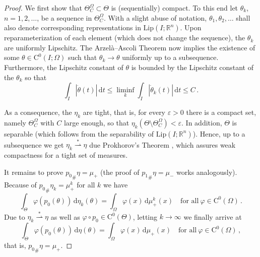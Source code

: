 \documentclass[10pt,a4paper,oneside,final]{article}
\newcommand{\R}{{\mathbb{R}}}
\newcommand{\de}{{\mathrm{d}}}
\newcommand{\pushforward}[2]{{{#1}_{\#}#2}}
\newcommand{\weakstarto}{\stackrel{*}{\rightharpoonup}}
\newcommand{\Lip}{\mathrm{Lip}}
\newcommand{\cont}{{\mathrm{C}}}
\newcommand{\contbdd}{\cont^0}
\numberwithin{equation}{section}
\theoremstyle{plain}
\theoremstyle{definition}
\theoremstyle{remark}
\begin{document}
\begin{proof}
We first show that $\Theta_C^\Omega\subset\Theta$ is (sequentially) compact.
To this end let $\theta_k$, $n=1,2,\ldots$, be a sequence in $\Theta_C^\Omega$.
With a slight abuse of notation, $\theta_1,\theta_2,\ldots$ shall also denote corresponding representations in $\Lip(I;\R^n)$.
Upon reparameterization of each element (which does not change the sequence), the $\theta_k$ are uniformly Lipschitz.
The Arzel\`a--Ascoli Theorem now implies the existence of some $\theta\in\cont^0(I;\Omega)$ such that $\theta_k\to\theta$ uniformly up to a subsequence.
Furthermore, the Lipschitz constant of $\theta$ is bounded by the Lipschitz constant of the $\theta_k$ so that
\begin{displaymath}
 \int_I |\dot\theta(t)|\,\de t \leq \liminf_k \int_I |\dot\theta_k(t)|\,\de t \leq C\,.
\end{displaymath}

As a consequence, the $\eta_k$ are tight, that is, for every $\varepsilon>0$ there is a compact set, namely $\Theta_C^\Omega$ with $C$ large enough, so that $\eta_k(\Theta\setminus\Theta_C^\Omega)<\varepsilon$.
In addition, $\Theta$ is separable (which follows from the separability of $\Lip(I;\R^n)$).
Hence, up to a subsequence we get $\eta_k \weakstarto \eta$ due Prokhorov's Theorem \cite[Thm.\,5.1]{Bil99}, which assures weak compactness for a tight set of measures.

It remains to prove $\pushforward{p_0}{\eta} = \mu_+$ (the proof of $\pushforward{p_1}{\eta} = \mu_-$ works analogously).
Because of $\pushforward{p_0}{\eta_k} = \mu_+^k$ for all $k$ we have
\begin{equation*}
 \int_\Theta \varphi(p_0(\theta))\,\de\eta_k(\theta)
 = \int_\Omega \varphi(x) \,\de\mu_+^k(x)
 \quad\text{for all}\ \varphi \in \contbdd(\Omega)\,.
\end{equation*}
Due to $\eta_k \weakstarto \eta$ as well as $\varphi\circ p_0\in\contbdd(\Theta)$, letting $k\to\infty$ we finally arrive at
\begin{equation*}%
 \int_\Theta \varphi(p_0(\theta))\,\de\eta(\theta)
 = \int_\Omega \varphi(x) \,\de\mu_+(x) \quad\text{for all}\ \varphi \in \contbdd(\Omega)\,,
\end{equation*}
that is, $\pushforward{p_0}{\eta} = \mu_+$.
\end{proof}
\end{document}
